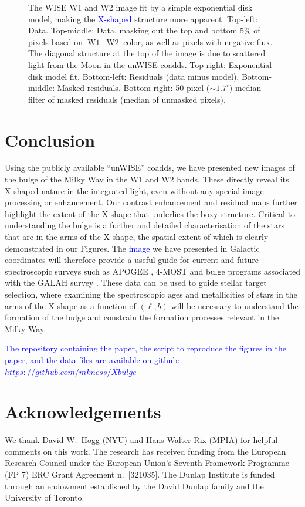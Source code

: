 \documentclass[12pt, preprint]{aastex}
\begin{document}
\begin{figure}[h!]
\caption{%
  The WISE W1 and W2 image fit by a simple exponential disk
  model, making the \textcolor{blue}{X-shaped} structure more apparent.
  Top-left: Data.  Top-middle: Data, masking out the top and bottom 5\%
  of pixels based on $\textrm{W1} - \textrm{W2}$ color, as well as pixels with negative flux.  The diagonal structure
  at the top of the image is due to scattered light from the Moon in the unWISE coadds.
  Top-right: Exponential disk model fit.
  Bottom-left: Residuals (data minus model).  Bottom-middle: Masked residuals.
  Bottom-right: 50-pixel ($\sim 1.7^{\circ}$) median filter of masked residuals (median of unmasked
  pixels).
  }
\label{fig:modfit}
\end{figure}




\section{Conclusion}

Using the publicly available ``unWISE'' coadds, we have presented new images of the bulge of the Milky Way in the W1 and W2 bands.  These directly reveal its X-shaped nature in the integrated light, even without any special image processing or enhancement. Our contrast enhancement and residual maps further highlight the extent of the X-shape that underlies the boxy structure. Critical to understanding the bulge is a further and detailed characterisation of the stars that are in the arms of the X-shape, the spatial extent of which is clearly demonstrated in our Figures. The \textcolor{blue}{image} we have presented in Galactic coordinates will therefore provide a useful guide for current and future spectroscopic surveys such as APOGEE \citep{Majewski2015}, 4-MOST \citep{4most} and bulge programs associated with the GALAH survey \citep{deSilva2015}. These data can be used to guide stellar target selection, where examining the spectroscopic ages \citep[e.g.][]{Martig2016, Ness2016} and metallicities of stars in the arms of the X-shape as a function of $(\ell,b)$ will be necessary to understand the formation of the bulge and constrain the formation processes relevant in the Milky Way. 

\textcolor{blue}{The repository containing the paper, the script to reproduce the figures in the paper, and the data files are available on github: $https://github.com/mkness/Xbulge$}


\section{Acknowledgements} 
We thank David W.~Hogg (NYU) and Hans-Walter Rix (MPIA) for helpful
comments on this work.  The research has received funding from the
European Research Council under the European Union's Seventh Framework
Programme (FP 7) ERC Grant Agreement n.~[321035].
%
The Dunlap Institute is funded through an endowment established by the David Dunlap family and the University of Toronto.
\end{document}
